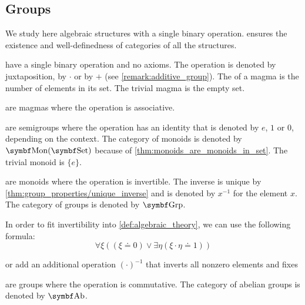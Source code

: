 \subsection{Groups}\label{subsec:groups}

\begin{definition}\label{def:magma}
  We study here algebraic structures with a single binary operation.  ensures the existence and well-definedness of categories of all the structures.

  \begin{itemize}
      have a single binary operation and no axioms. The operation is denoted by juxtaposition, by \( \cdot \) or by \( + \) (see \cref{remark:additive_group}). The  of a magma is the number of elements in its set. The trivial magma is the empty set.

      are magmas where the operation is associative.

      are semigroups where the operation has an identity that is denoted by \( e \), \( 1 \) or \( 0 \), depending on the context. The category of monoids is denoted by \( \Cat{Mon}(\Cat{Set}) \) because of \cref{thm:monoids_are_monoids_in_set}. The trivial monoid is \( \{ e \} \).

      are monoids where the operation is invertible. The inverse is unique by \cref{thm:group_properties/unique_inverse} and is denoted by \( x^{-1} \) for the element \( x \). The category of groups is denoted by \( \Cat{Grp} \).

    In order to fit invertibility into \cref{def:algebraic_theory}, we can use the following formula:
    \begin{equation*}
      \forall \xi ((\xi \doteq 0) \lor \exists \eta (\xi \cdot \eta \doteq 1))
    \end{equation*}

    or add an additional operation \( (\cdot)^{-1} \) that inverts all nonzero elements and fixes

      are groups where the operation is commutative. The category of abelian groups is denoted by \( \Cat{Ab} \).
  \end{itemize}


\end{definition}
